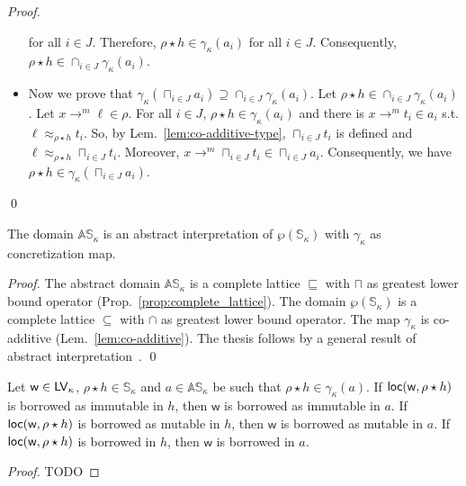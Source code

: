 \begin{proof}
\begin{itemize}
    for all $i\in J$. Therefore, $\rho\star h\in\gamma_\kappa(a_i)$
    for all $i\in J$. Consequently,
    $\rho\star h\in\cap_{i\in J}\gamma_\kappa(a_i)$.
    \item Now we prove that
    $\gamma_\kappa(\sqcap_{i\in J}a_i)\supseteq\cap_{i\in J}\gamma_\kappa(a_i)$.
    Let $\rho\star h\in\cap_{i\in J}\gamma_\kappa(a_i)$.
    Let $x\to^m\ell\in\rho$.
    For all $i\in J$, $\rho\star h\in\gamma_\kappa(a_i)$ and there
    is $x\to^m t_i\in a_i$ s.t. $\ell\approx_{\rho\star h}t_i$.
    So, by Lem.~\ref{lem:co-additive-type}, $\sqcap_{i\in J}t_i$ is defined
    and $\ell\approx_{\rho\star h}\sqcap_{i\in J}t_i$.
    Moreover, $x\to^m \sqcap_{i\in J}t_i \in \sqcap_{i\in J}a_i$.
    Consequently, we have $\rho\star h\in\gamma_\kappa(\sqcap_{i\in J}a_i)$.
  \end{itemize}
  \qed
\end{proof}

\begin{proposition}\label{prop:abstract_interpretation}
  The domain $\mathbb{AS}_\kappa$ is an abstract interpretation of $\wp(\mathbb{S}_\kappa)$
  with $\gamma_\kappa$ as concretization map.
\end{proposition}
\begin{proof}
  The abstract domain $\mathbb{AS}_\kappa$ is a complete lattice \wrt $\sqsubseteq$
  with $\sqcap$ as greatest lower bound operator (Prop.~\ref{prop:complete_lattice}).
  The domain $\wp(\mathbb{S}_\kappa)$ is a complete lattice \wrt $\subseteq$ with $\cap$ as
  greatest lower bound operator. The map $\gamma_\kappa$ is co-additive (Lem.~\ref{lem:co-additive}).
  The thesis follows by a general result of abstract interpretation~\cite{CousotC77}.
  \qed
\end{proof}

\begin{proposition}
  \label{prop:abstract_dangling_correctness}
  Let $\mathsf{w}\in\mathsf{LV}_\kappa$, $\rho\star h\in\mathbb{S}_\kappa$
  and $a\in\mathbb{AS}_\kappa$ be
  such that $\rho\star h\in\gamma_\kappa(a)$.
  If $\mathsf{loc}(\mathsf{w},\rho\star h)$ is borrowed as immutable in $h$, then
  $\mathsf{w}$ is borrowed as immutable in $a$.
  If $\mathsf{loc}(\mathsf{w},\rho\star h)$ is borrowed as mutable in $h$, then
  $\mathsf{w}$ is borrowed as mutable in $a$.
  If $\mathsf{loc}(\mathsf{w},\rho\star h)$ is borrowed in $h$, then
  $\mathsf{w}$ is borrowed in $a$.  
\end{proposition}
\begin{proof}
  TODO
\end{proof}

